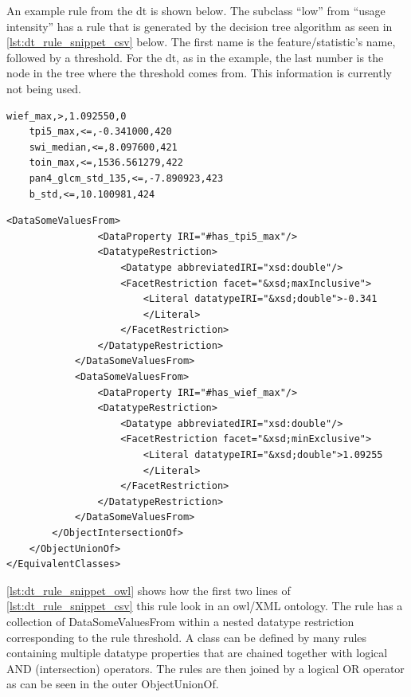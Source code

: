\documentclass[authoryear,final,12pt,number]{elsarticle}
\begin{document}
An example rule from the \gls{dt} is shown below. The subclass ``low'' from 
``usage intensity'' has a rule that is generated by the decision tree algorithm 
as seen in \ref{lst:dt_rule_snippet_csv} below. The first name is the 
feature/statistic's name, followed by a threshold. For the \gls{dt}, as in the 
example, the last number is the node in the tree where the threshold comes 
from. This information is currently not being used.
\lstset{language=XML,tabsize=2, label=lst:dt_rule_snippet_csv, caption=\lstname}
\begin{lstlisting}[frame=single]
    wief_max,>,1.092550,0
    tpi5_max,<=,-0.341000,420
    swi_median,<=,8.097600,421
    toin_max,<=,1536.561279,422
    pan4_glcm_std_135,<=,-7.890923,423
    b_std,<=,10.100981,424
\end{lstlisting}

\lstset{basicstyle=\footnotesize,language=XML,tabsize=2,
label=lst:dt_rule_snippet_owl , caption=\lstname, breaklines=true}
\begin{lstlisting}[frame=single,fontadjust]
            <DataSomeValuesFrom>
                <DataProperty IRI="#has_tpi5_max"/>
                <DatatypeRestriction>
                    <Datatype abbreviatedIRI="xsd:double"/>
                    <FacetRestriction facet="&xsd;maxInclusive">
                        <Literal datatypeIRI="&xsd;double">-0.341
                        </Literal>
                    </FacetRestriction>
                </DatatypeRestriction>
            </DataSomeValuesFrom>
            <DataSomeValuesFrom>
                <DataProperty IRI="#has_wief_max"/>
                <DatatypeRestriction>
                    <Datatype abbreviatedIRI="xsd:double"/>
                    <FacetRestriction facet="&xsd;minExclusive">
                        <Literal datatypeIRI="&xsd;double">1.09255
                        </Literal>
                    </FacetRestriction>
                </DatatypeRestriction>
            </DataSomeValuesFrom>
        </ObjectIntersectionOf>
    </ObjectUnionOf>
</EquivalentClasses>
\end{lstlisting}

\ref{lst:dt_rule_snippet_owl} shows how the first two lines of 
\ref{lst:dt_rule_snippet_csv} this rule look in an \gls{owl}/XML ontology. The 
rule has a collection of DataSomeValuesFrom within a nested datatype 
restriction 
corresponding to the rule threshold. A class can be defined by many rules 
containing multiple datatype properties that are chained together with logical 
AND (intersection) operators. The rules are then joined by a logical OR 
operator 
as can be seen in the outer ObjectUnionOf. 
\end{document}
